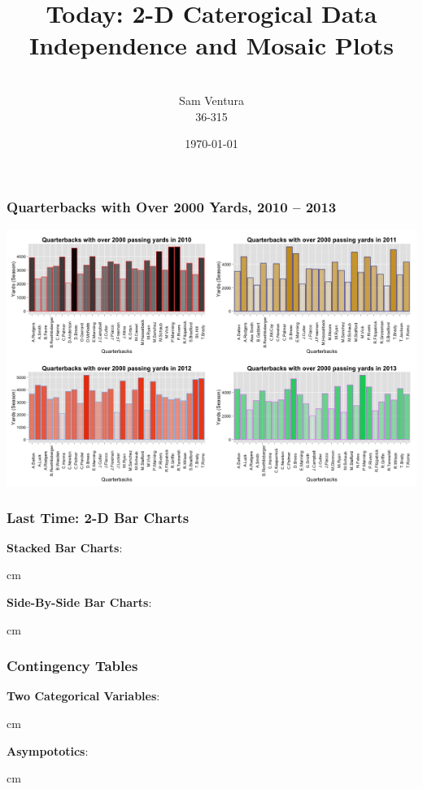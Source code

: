\documentclass{beamer} %
\begin{document}
\title[dedup]{Today:  2-D Caterogical Data \\ Independence and Mosaic Plots}


\author[Samuel L. Ventura]{\\
  \large{Sam Ventura\\36-315}}
\date{\today}


\begin{frame}
	\maketitle
	
\end{frame}





\begin{frame}\frametitle{Quarterbacks with Over 2000 Yards, 2010 -- 2013}
	\includegraphics[width=\linewidth]{qbs.png}
\end{frame}


\begin{frame}\frametitle{Last Time:  2-D Bar Charts}
	\small
	
	\textbf{Stacked Bar Charts}:  
	
	 cm
	
	\textbf{Side-By-Side Bar Charts}:
	
	
	 cm
	
\end{frame}


\begin{frame}\frametitle{Contingency Tables}
	\small
	
	\textbf{Two Categorical Variables}:  %
	
	
	
	 cm
	
	\textbf{Asympototics}:  %
	
	
	
	 cm
	
\end{frame}
\end{document}
